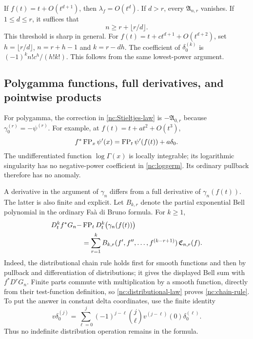 \begin{remark}
\label{nc:higher-tangency}
If $f(t)=t+O(t^{d+1})$, then $\lambda_f=O(t^d)$. If $d>r$, every
$\mathfrak A_{n,r}$ vanishes. If $1\leq d\leq r$, it suffices that
\[
 n\geq r+\lfloor r/d\rfloor.
\]
This threshold is sharp in general. For
$f(t)=t+c t^{d+1}+O(t^{d+2})$, set
$h=\lfloor r/d\rfloor$, $n=r+h-1$ and $k=r-dh$. The coefficient of
$\delta_0^{(k)}$ is
$(-1)^kn!c^h/(h!k!)$. This follows from the same lowest-power argument.
\end{remark}

\subsection{Polygamma functions, full derivatives, and pointwise products}

For polygamma, the correction in
\eqref{nc:Stieltjes-law} is $-\mathfrak A_{0,r}$ because
$\gamma_0^{(r)}=-\psi^{(r)}$. For example, at
$f(t)=t+a t^2+O(t^3)$,
\begin{equation}\label{nc:trigamma}
 f^*\operatorname{FP}_x\psi'(x)
    =\operatorname{FP}_t\psi'(f(t))+a\delta_0.
\end{equation}
The undifferentiated function $\log\Gamma(x)$ is locally integrable;
its logarithmic singularity has no negative-power coefficient in
\eqref{nc:loggerm}. Its ordinary pullback therefore has no anomaly.

A derivative in the argument of $\gamma_n$ differs from a full
derivative of $\gamma_n(f(t))$. The latter is also finite and explicit.
Let $B_{k,r}$ denote the partial exponential Bell polynomial in the
ordinary Fa\`a di Bruno formula. For $k\geq1$,
\begin{align}\label{nc:chain-rule}
 D_t^kf^*G_n-&\operatorname{FP}_tD_t^k\bigl(\gamma_n(f(t))\bigr)\notag\\
   &=\sum_{r=1}^k
       B_{k,r}(f',f'',\ldots,f^{(k-r+1)})\,
                         \mathfrak C_{n,r}(f).
\end{align}
Indeed, the distributional chain rule holds first for smooth functions
and then by pullback and differentiation of distributions; it gives
the displayed Bell sum with $f^*D^rG_n$. Finite parts commute with
multiplication by a smooth function, directly from their test-function
definition, so \eqref{nc:distributional-law} proves
\eqref{nc:chain-rule}. To put the answer in constant delta coordinates,
use the finite identity
\begin{equation}\label{nc:delta-multiplier}
 v\delta_0^{(j)}
   =\sum_{\ell=0}^j(-1)^{j-\ell}\binom j\ell
       v^{(j-\ell)}(0)\delta_0^{(\ell)}.
\end{equation}
Thus no indefinite distribution operation remains in the formula.

